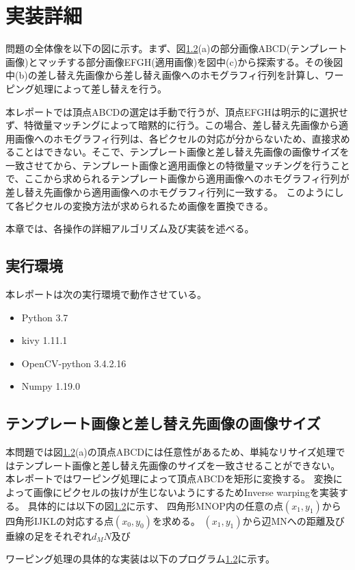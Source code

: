 \section{実装詳細}
問題の全体像を以下の図に示す。まず、図\ref{}(a)の部分画像ABCD(テンプレート画像)とマッチする部分画像EFGH(適用画像)を図中(c)から探索する。その後図中(b)の差し替え先画像から差し替え画像へのホモグラフィ行列を計算し、ワーピング処理によって差し替えを行う。

本レポートでは頂点ABCDの選定は手動で行うが、頂点EFGHは明示的に選択せず、特徴量マッチングによって暗黙的に行う。この場合、差し替え先画像から適用画像へのホモグラフィ行列は、各ピクセルの対応が分からないため、直接求めることはできない。そこで、テンプレート画像と差し替え先画像の画像サイズを一致させてから、テンプレート画像と適用画像との特徴量マッチングを行うことで、ここから求められるテンプレート画像から適用画像へのホモグラフィ行列が差し替え先画像から適用画像へのホモグラフィ行列に一致する。
このようにして各ピクセルの変換方法が求められるため画像を置換できる。

本章では、各操作の詳細アルゴリズム及び実装を述べる。

\subsection{実行環境}
本レポートは次の実行環境で動作させている。
\begin{itemize}
    \item Python 3.7
    \item kivy 1.11.1
    \item OpenCV-python 3.4.2.16
    \item Numpy 1.19.0
\end{itemize}



\subsection{テンプレート画像と差し替え先画像の画像サイズ}
本問題では図\ref{}(a)の頂点ABCDには任意性があるため、単純なリサイズ処理ではテンプレート画像と差し替え先画像のサイズを一致させることができない。
本レポートではワーピング処理によって頂点ABCDを矩形に変換する。
変換によって画像にピクセルの抜けが生じないようにするためInverse warpingを実装する。
具体的には以下の図\ref{}に示す、
四角形MNOP内の任意の点$(x_1, y_1)$から四角形IJKLの対応する点$(x_0, y_0)$を求める。
$(x_1, y_1)$から辺MNへの距離及び垂線の足をそれぞれ$d_MN$及び$\bm{}$


ワーピング処理の具体的な実装は以下のプログラム\ref{}に示す。





